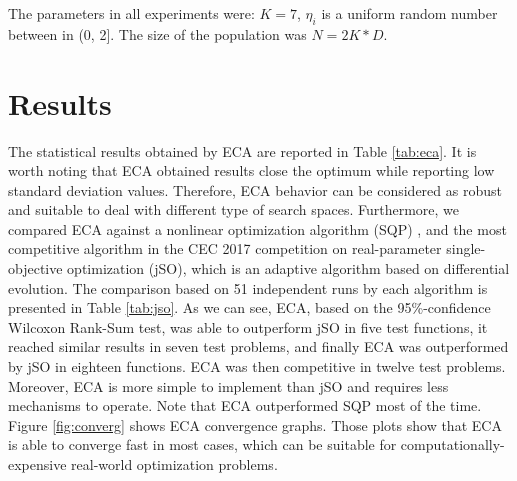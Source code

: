 \documentclass{svproc}
\begin{document}
The parameters in all experiments were: $K = 7$, $\eta_i$ is a uniform random number 
between in (0, 2]. The size of the population was $N = 2K * D $.




\section{Results} %
\label{sec:results}

The statistical results obtained by ECA are reported in Table \ref{tab:eca}. 
It is worth noting  that ECA obtained results close the optimum 
while reporting low standard deviation values. Therefore, ECA behavior can 
be considered as robust and suitable to deal with different type of search spaces. 
Furthermore, we compared ECA against a nonlinear optimization algorithm (SQP) \cite{sqp}, 
and the most competitive algorithm in 
the CEC 2017 competition on real-parameter single-objective optimization (jSO), 
which is an adaptive algorithm based on differential evolution. The comparison 
based on 51 independent runs by each algorithm is presented in Table \ref{tab:jso}. 
As we can see, ECA, based on the 95\%-confidence Wilcoxon Rank-Sum test, 
was able to outperform jSO in five test functions, it reached similar 
results in seven test problems, and finally ECA was outperformed by jSO 
in eighteen functions. ECA was then competitive in twelve test problems. 
Moreover, ECA is more simple to implement than jSO and requires less 
mechanisms to operate. Note that  ECA outperformed SQP most of the time.
\\

Figure \ref{fig:converg} shows ECA convergence graphs. Those plots show that 
ECA is able to converge fast in most cases, which can be suitable for 
computationally-expensive real-world optimization problems.  
\end{document}
